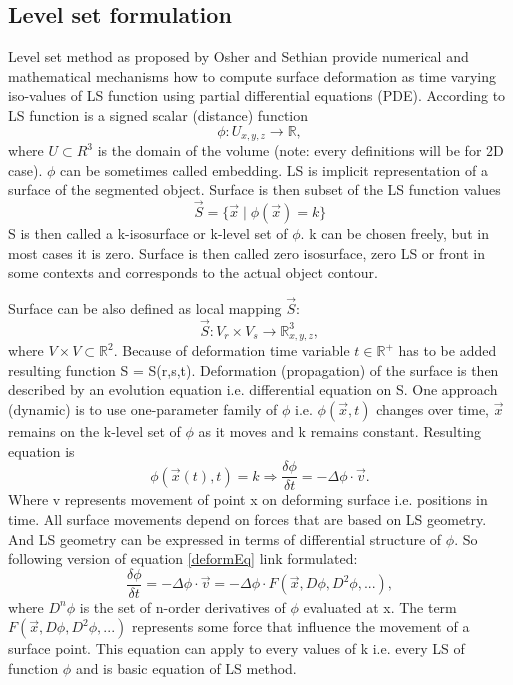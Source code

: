 \subsection{Level set formulation}

Level set method as proposed by Osher and Sethian \cite{sethianLS} provide numerical and mathematical mechanisms how to compute surface deformation as time varying iso-values of LS function using partial differential equations (PDE).
According to \cite{insightIntoImages} LS function is a signed scalar (distance) function
\begin{equation}
\phi : U_{x,y,z} \rightarrow \mathbb R,
\end{equation}
where $U \subset R^3$ is the domain of the volume (note: every definitions will be for 2D case).
$\phi$ can be sometimes called embedding. LS is implicit representation of a surface of the segmented object.
Surface is then subset of the LS function values
\begin{equation}
\vec{S} = \{\vec{x}\mid \phi(\vec{x}) = k\}
\end{equation}
S is then called a k-isosurface or k-level set of $\phi$. k can be chosen freely, but in most cases it is zero.
Surface is then called zero isosurface, zero LS or front in some contexts and corresponds to the actual object contour.

Surface can be also defined as local mapping $\vec{S}$:
\begin{equation}
\vec{S}: V_r \times V_s \rightarrow \mathbb R^3_{x,y,z},
\end{equation}
where $V \times V \subset \mathbb R^2$. Because of deformation time variable $t\in \mathbb R^+$ has to be added resulting function S = S(r,s,t).
Deformation (propagation) of the surface is then described by an evolution equation i.e. differential equation on S.
One approach (dynamic) is to use one-parameter family of $\phi$ i.e. $\phi(\vec{x},t)$ changes over time, $\vec{x}$ remains on the k-level set of $\phi$ as it moves and k remains constant.
Resulting equation is
\begin{equation}
\label{deformEq}
\phi(\vec{x}(t),t) = k \Rightarrow \frac{\delta \phi}{\delta t} = - \Delta \phi
\cdot \vec{v}.
\end{equation}
Where v represents movement of point x on deforming surface i.e. positions in time.
All surface movements depend on forces that are based on LS geometry.
And LS geometry can be expressed in terms of differential structure of $\phi$.
So following version of equation \ref{deformEq} link formulated:
\begin{equation}
\frac{\delta\phi}{\delta t} = - \Delta \phi \cdot \vec{v} = - \Delta \phi
\cdot F(\vec{x}, D\phi, D^2\phi, ...),
\end{equation}
where $D^n\phi$ is the set of n-order derivatives of $\phi$ evaluated at x.
The term $F(\vec{x}, D\phi, D^2\phi, ...)$ represents some force that influence the movement of a surface point.
This equation can apply to every values of k i.e. every LS of function $\phi$ and is basic equation of LS method.

